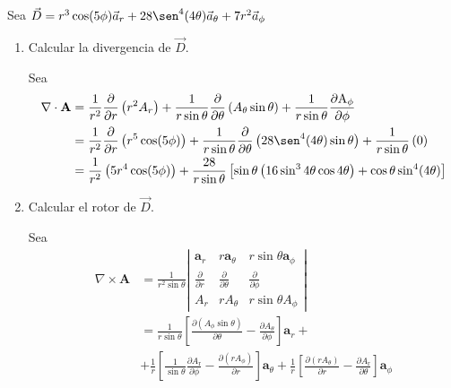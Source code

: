 \begin{problema}
    Sea $\vec{D}=r^3 \cos (5 \phi) \vec{a}_r+28 \sen^4(4 \theta) \vec{a}_\theta+7 r^2 \vec{a}_{\phi}$
    \begin{enumerate}
        \item Calcular la divergencia de $\vec{D}$.
        \begin{sol}
            Sea
            \begin{align*}
                \nabla \cdot \mathbf{A} &=\frac{1}{r^2} \frac{\partial}{\partial r}\left(r^2 A_r\right)+\frac{1}{r \sin \theta} \frac{\partial}{\partial \theta}\left(A_\theta \sin \theta\right)+\frac{1}{r \sin \theta} \frac{\partial \mathrm{A}_\phi}{\partial \phi}\\
                &= \frac{1}{r^2} \frac{\partial}{\partial r}\left(r^5 \cos (5 \phi)\right)+\frac{1}{r \sin \theta} \frac{\partial}{\partial \theta}\left(28 \sen^4(4 \theta)\sin \theta\right)+\frac{1}{r \sin \theta} \left(0\right)\\
                &= \frac{1}{r^2} \left(5r^4 \cos (5 \phi)\right)+\frac{28}{r \sin \theta} \left[\sin\theta\left(16\sin^34\theta\cos4\theta\right)+\cos\theta \sin^4(4\theta )\right]
            \end{align*}
        \end{sol}
        \item Calcular el rotor de $\vec{D}$.
        \begin{sol}
            Sea
            \begin{align*}
                \nabla \times \mathbf{A} &=\frac{1}{r^2 \sin \theta}\left|\begin{array}{lll}
                    \mathbf{a}_r & r \mathbf{a}_\theta & r \sin \theta \mathbf{a}_\phi \\
                    \frac{\partial}{\partial r} & \frac{\partial}{\partial \theta} & \frac{\partial}{\partial \phi} \\
                    A_r & r A_\theta & r \sin \theta A_\phi
                    \end{array}\right|\\
                    &= \frac{1}{r \sin \theta}\left[\frac{\partial\left(A_\phi \sin \theta\right)}{\partial \theta}-\frac{\partial A_\theta}{\partial \phi}\right] \mathbf{a}_r +\\
                        & +\frac{1}{r}\left[\frac{1}{\sin \theta} \frac{\partial A_{\mathrm{r}}}{\partial \phi}-\frac{\partial\left(r A_\phi\right)}{\partial r}\right] \mathbf{a}_\theta+\frac{1}{r}\left[\frac{\partial\left(r A_\theta\right)}{\partial r}-\frac{\partial A_{\mathrm{r}}}{\partial \theta}\right] \mathbf{a}_\phi\\

\end{align*}
\end{sol}
\end{enumerate}
\end{problema}
